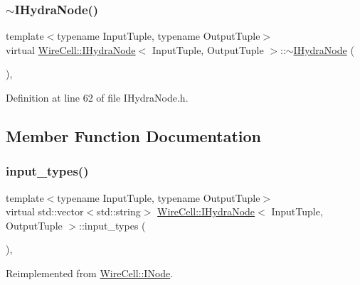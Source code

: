 \subsubsection{\texorpdfstring{$\sim$\+I\+Hydra\+Node()}{~IHydraNode()}}
{\footnotesize\ttfamily template$<$typename Input\+Tuple, typename Output\+Tuple$>$ \\
virtual \hyperlink{class_wire_cell_1_1_i_hydra_node}{Wire\+Cell\+::\+I\+Hydra\+Node}$<$ Input\+Tuple, Output\+Tuple $>$\+::$\sim$\hyperlink{class_wire_cell_1_1_i_hydra_node}{I\+Hydra\+Node} (\begin{DoxyParamCaption}{ }\end{DoxyParamCaption})\hspace{0.3cm}{\ttfamily [inline]}, {\ttfamily [virtual]}}



Definition at line 62 of file I\+Hydra\+Node.\+h.



\subsection{Member Function Documentation}
\mbox{\label{class_wire_cell_1_1_i_hydra_node_af02cf39a567f4a64d34c527b6c09febf}} 
\subsubsection{\texorpdfstring{input\+\_\+types()}{input\_types()}}
{\footnotesize\ttfamily template$<$typename Input\+Tuple, typename Output\+Tuple$>$ \\
virtual std\+::vector$<$std\+::string$>$ \hyperlink{class_wire_cell_1_1_i_hydra_node}{Wire\+Cell\+::\+I\+Hydra\+Node}$<$ Input\+Tuple, Output\+Tuple $>$\+::input\+\_\+types (\begin{DoxyParamCaption}{ }\end{DoxyParamCaption})\hspace{0.3cm}{\ttfamily [inline]}, {\ttfamily [virtual]}}



Reimplemented from \hyperlink{class_wire_cell_1_1_i_node_ae13fc140c8e815fac9327dfa5b43f853}{Wire\+Cell\+::\+I\+Node}.



